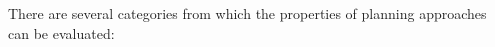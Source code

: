 %    
%    
%    
%    
%

There are several categories from which the properties of planning approaches can be evaluated: 


